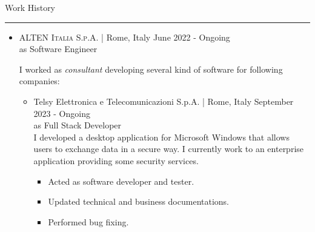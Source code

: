 \documentclass[english,10pt,a4paper]{article}
\newcommand{\SubCompanyName}[1]{\textcolor{CvIcon}{{\footnotesize \textsf{#1}}}}
\newcommand{\CompanyName}[1]{\textsc{{\small #1}}}
\newcommand{\JobTimeRange}[1]{{\scriptsize \textcolor{CvColor!50}{\faCalendar*} \hspace{0.01cm} \textcolor{CvIcon}{#1}}}
\newcommand{\CvSection}[2]{
	\hspace{0.25cm}\textcolor{CvColor!50}{#1} \hspace{0.01cm} \textcolor{CvColor!80}{#2}\\
	\textcolor{CvColor}{\rule[.7\baselineskip]{\textwidth}{1pt}}}
\begin{document}
\begin{paracol}{2}
\begin{tcolorbox}[colback=CvSidebarBackColor,height=\textheight,boxrule=0pt, left=0pt,right=0pt,top=0pt,bottom=0pt, arc=0pt,outer arc=0pt, colframe=CvSidebarBackColor]
\begin{center}
\end{center}
		
	
		
	
	
		
\end{tcolorbox}
\switchcolumn
\begin{tcolorbox}[colback=white, height=\textheight, colframe=white, left=0cm]

		
		\vspace{0.3cm}	
		\CvSection{\faBriefcase}{Work History}
	
	\begin{itemize}		
		\item \CompanyName{ALTEN Italia S.p.A.} \textcolor{CvColor}{|} {\scriptsize Rome, Italy} \hfill \JobTimeRange{June 2022 - Ongoing} \\
		{\scriptsize \textcolor{CvIcon}{as} \textcolor{CvColor}{Software Engineer}} 
		\vspace{0.25cm}
		
			{
				\footnotesize I worked as \textit{consultant} developing several kind of software for following companies:
				\begin{itemize}
					
					\item \SubCompanyName{Telsy Elettronica e Telecomunicazioni S.p.A.} \textcolor{CvColor}{|} {\scriptsize Rome, Italy} \hfill \JobTimeRange{September 2023 - Ongoing}\\	
					{\scriptsize \textcolor{CvIcon}{as} \textcolor{CvColor}{Full Stack Developer}}\\		
					
					I developed a desktop application for Microsoft Windows that allows users to exchange data in a secure way. I currently work to an enterprise application providing some security services.
					
					\begin{itemize}
						\item Acted as software developer and tester.
						\item Updated technical and business documentations.
						\item Performed bug fixing.
					\end{itemize}
					

\end{itemize}}
\end{itemize}
\end{tcolorbox}
\end{paracol}
\end{document}
